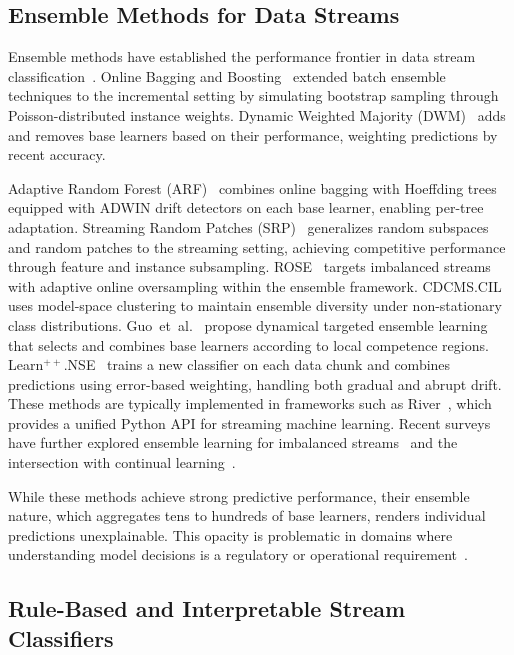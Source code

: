 \documentclass[lettersize,journal]{IEEEtran}
\begin{document}
\subsection{Ensemble Methods for Data Streams}

Ensemble methods have established the performance frontier in data stream classification~\cite{krawczyk2017ensemble}. Online Bagging and Boosting~\cite{oza2001bagging} extended batch ensemble techniques to the incremental setting by simulating bootstrap sampling through Poisson-distributed instance weights. Dynamic Weighted Majority (DWM)~\cite{kolter2007dwm} adds and removes base learners based on their performance, weighting predictions by recent accuracy.

Adaptive Random Forest (ARF)~\cite{gomes2017adaptive} combines online bagging with Hoeffding trees equipped with ADWIN drift detectors on each base learner, enabling per-tree adaptation. Streaming Random Patches (SRP)~\cite{gomes2019streaming} generalizes random subspaces and random patches to the streaming setting, achieving competitive performance through feature and instance subsampling. ROSE~\cite{cano2022rose} targets imbalanced streams with adaptive online oversampling within the ensemble framework. CDCMS.CIL~\cite{chiu2025cdcms} uses model-space clustering to maintain ensemble diversity under non-stationary class distributions. Guo~et~al.~\cite{guo2024dynamical} propose dynamical targeted ensemble learning that selects and combines base learners according to local competence regions. Learn$^{++}$.NSE~\cite{elwell2011learn} trains a new classifier on each data chunk and combines predictions using error-based weighting, handling both gradual and abrupt drift. These methods are typically implemented in frameworks such as River~\cite{montiel2021river}, which provides a unified Python API for streaming machine learning. Recent surveys have further explored ensemble learning for imbalanced streams~\cite{aguiar2024imbalanced} and the intersection with continual learning~\cite{gunasekara2023survey}.

While these methods achieve strong predictive performance, their ensemble nature, which aggregates tens to hundreds of base learners, renders individual predictions unexplainable. This opacity is problematic in domains where understanding model decisions is a regulatory or operational requirement~\cite{rudin2019stop}.

\subsection{Rule-Based and Interpretable Stream Classifiers}
\end{document}
